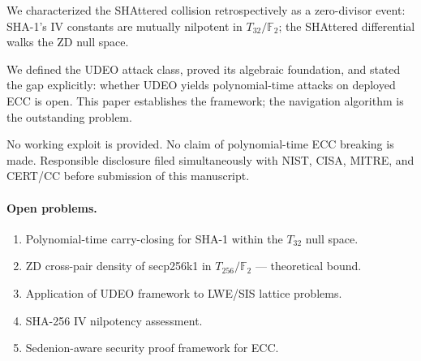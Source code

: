 \documentclass[runningheads]{llncs}
\theoremstyle{plain}
\theoremstyle{definition}
\newcommand{\GFtwo}{\mathbb{F}_2}
\begin{document}
We characterized the SHAttered collision retrospectively as a zero-divisor
event: SHA-1's IV constants are mutually nilpotent in $T_{32}/\GFtwo$;
the SHAttered differential walks the ZD null space.

We defined the UDEO attack class, proved its algebraic foundation,
and stated the gap explicitly: whether UDEO yields polynomial-time
attacks on deployed ECC is open. This paper establishes the framework;
the navigation algorithm is the outstanding problem.

No working exploit is provided. No claim of polynomial-time ECC breaking
is made. Responsible disclosure filed simultaneously with NIST, CISA,
MITRE, and CERT/CC before submission of this manuscript.

\paragraph{Open problems.}
\begin{enumerate}
\item Polynomial-time carry-closing for SHA-1 within the $T_{32}$ null space.
\item ZD cross-pair density of secp256k1 in $T_{256}/\GFtwo$ — theoretical bound.
\item Application of UDEO framework to LWE/SIS lattice problems.
\item SHA-256 IV nilpotency assessment.
\item Sedenion-aware security proof framework for ECC.
\end{enumerate}
\end{document}
